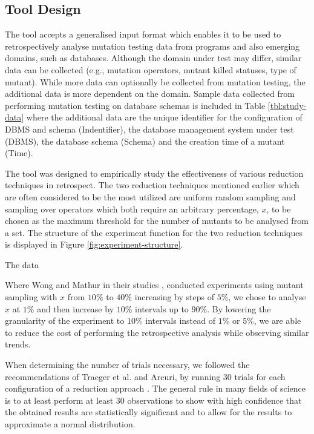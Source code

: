 \subsection{Tool Design}

The \mr tool accepts a generalised input format which enables it to be used to retrospectively analyse mutation testing
data from programs and also emerging domains, such as databases. Although the domain under test may differ,
similar data can be collected (e.g., mutation operators, mutant killed statuses, type of mutant). While more data
can optionally be collected from mutation testing, the additional data is more
dependent on the domain. Sample data collected from performing mutation testing on database schemas
is included in Table \ref{tbl:study-data} where the additional data are
the unique identifier for the configuration of DBMS and schema (Indentifier),
the database management system under test (DBMS), the database schema (Schema) and the creation time of a mutant (Time).

The \mr tool was designed to empirically study the effectiveness of
various reduction techniques in retrospect. The two reduction techniques mentioned earlier which are often considered
to be the most utilized are uniform random sampling
and sampling over operators which both require an arbitrary percentage, $x$, to be chosen as the maximum threshold
for the number of mutants to be analysed from a set. The structure of the experiment function for the two
reduction techniques is displayed in Figure \ref{fig:experiment-structure}.

The data

Where Wong and Mathur in their studies \cite{mathur1994empirical}, \cite{wong1993mutation} conducted
experiments using mutant sampling with $x$ from $10\%$ to $40\%$ increasing by steps of $5\%$, we
chose to analyse $x$ at $1\%$ and then increase by $10\%$ intervals up to $90\%$. By lowering
the granularity of the experiment to $10\%$ intervals instead of
$1\%$ or $5\%$, we are able to reduce the cost of performing the retrospective analysis while observing
similar trends.

When determining the number of trials necessary, we followed
the recommendations of Traeger et al. and Arcuri, by running 30 trials for each configuration of a reduction approach \cite{traeger2008nine, arcuri2014hitchhiker}.
The general rule in many fields of science is to at least perform at least 30 observations to show with high confidence
that the obtained results are statistically significant and to allow for the results to approximate a normal
distribution.

